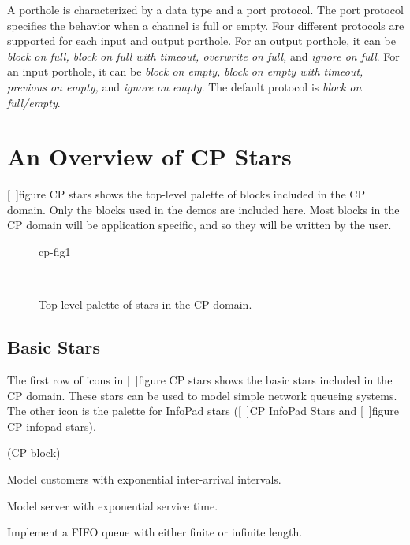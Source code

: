 A porthole is characterized by a data type and a port protocol.
 
The port protocol specifies the behavior when a channel is
full or empty.  Four different protocols are supported for each input
and output porthole.  For an output porthole, it can be \emph{block on
full, block on full with timeout, overwrite on full,} and \emph{ignore
on full}.  For an input porthole, it can be \emph{block on empty,
block on empty with timeout, previous on empty,} and \emph{ignore on
empty}.  The default protocol is \emph{block on full/empty}.

\section{An Overview of CP Stars}
\label{CP Star Overview}

[~\Ref]{figure CP stars} shows the top-level palette of blocks
included in the CP domain.  Only the blocks used in the demos are
included here.  Most blocks in the CP domain will be application
specific, and so they will be written by the user.

\begin{figure}
\begin{gif}{cp-fig1}
\begin{center}
\ 
\end{center}
\caption{Top-level palette of stars in the CP domain.}
\label{figure CP stars}
\end{gif}
\end{figure}

\subsection{Basic Stars}
\label{CP Basic Stars}

The first row of icons in [~\Ref]{figure CP stars} shows the
basic stars included in the CP domain.  These stars can be used to
model simple network queueing systems.  The other icon is the palette
for InfoPad stars ([~\Ref]{CP InfoPad Stars}
and [~\Ref]{figure CP infopad stars}).

\begin{indexlist}{ (CP block)}

Model customers with exponential inter-arrival intervals.

Model server with exponential service time.

Implement a FIFO queue with either finite or infinite length.

\end{indexlist}

